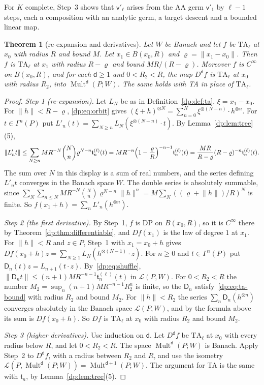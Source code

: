 \documentclass[11pt]{amsart}
\newtheorem{theorem}{Theorem}[section]
\theoremstyle{definition}
\theoremstyle{remark}
\numberwithin{equation}{section}
\newcommand{\cL}{\mathcal L}
\newcommand{\Mult}{\operatorname{Mult}}
\newcommand{\norm}[1]{\lVert #1\rVert}
\theoremstyle{plain}
\theoremstyle{definition}
\theoremstyle{plain}
\begin{document}
For $K$ complete, Step~3 shows that $\mathsf v'_\ell$ arises from the AA germ $\mathsf v'_1$ by $\ell-1$ steps, each a composition with an analytic germ, a target descent and a bounded linear map.

\begin{theorem}[re-expansion and derivatives]\label{dp:thm:ta-recenter}
Let $W$ be Banach and let $f$ be $\mathrm{TA}_\ell$ at $x_0$ with radius $R$ and bound $M$. Let $x_1\in B(x_0,R)$ and $\varrho=\norm{x_1-x_0}$. Then $f$ is $\mathrm{TA}_\ell$ at $x_1$ with radius $R-\varrho$ and bound $MR/(R-\varrho)$. Moreover $f$ is $C^\infty$ on $B(x_0,R)$, and for each $\mathsf d\ge1$ and $0<R_2<R$, the map $D^{\mathsf d}f$ is $\mathrm{TA}_\ell$ at $x_0$ with radius $R_2$, into $\Mult^{\mathsf d}(P;W)$. The same holds with TA in place of $\mathrm{TA}_\ell$.
\end{theorem}

\begin{proof}
\emph{Step 1 (re-expansion).} Let $L_N$ be as in Definition~\ref{dp:def:ta}, $\xi=x_1-x_0$. For $\norm h<R-\varrho$, \eqref{dp:eq:orbit} gives $(\xi+h)^{\otimes N}=\sum_{n=0}^N\xi^{\otimes(N-n)}\cdot h^{\otimes n}$. For $t\in\Gamma^n(P)$ put $L'_n(t)=\sum_{N\ge n}L_N(\xi^{\otimes(N-n)}\cdot t)$. By Lemma~\ref{dp:lem:tree}(5),
\[
 \norm{L'_nt}\le\sum_{N\ge n}MR^{-N}\binom Nn\varrho^{N-n}\mathfrak t^{(\ell)}_n(t)=MR^{-n}\Bigl(1-\frac\varrho R\Bigr)^{-n-1}\mathfrak t^{(\ell)}_n(t)=\frac{MR}{R-\varrho}(R-\varrho)^{-n}\mathfrak t^{(\ell)}_n(t).
\]
The sum over $N$ in this display is a sum of real numbers, and the series defining $L'_nt$ converges in the Banach space $W$. The double series is absolutely summable, since $\sum_N\sum_{n\le N}MR^{-N}\binom Nn\varrho^{N-n}\norm h^n=M\sum_N((\varrho+\norm h)/R)^N$ is finite. So $f(x_1+h)=\sum_nL'_n(h^{\otimes n})$.

\emph{Step 2 (the first derivative).} By Step~1, $f$ is DP on $B(x_0,R)$, so it is $C^\infty$ there by Theorem~\ref{dp:thm:differentiable}, and $Df(x_1)$ is the law of degree $1$ at $x_1$. For $\norm h<R$ and $z\in P$, Step~1 with $x_1=x_0+h$ gives $Df(x_0+h)z=\sum_{N\ge1}L_N(h^{\otimes(N-1)}\cdot z)$. For $n\ge0$ and $t\in\Gamma^n(P)$ put $\mathsf D_n(t)z=L_{n+1}(t\cdot z)$. By~\eqref{dp:eq:shuffle}, $\norm{\mathsf D_nt}\le(n+1)MR^{-n-1}\mathfrak t^{(\ell)}_n(t)$ in $\cL(P,W)$. For $0<R_2<R$ the number $M_2=\sup_n(n+1)MR^{-n-1}R_2^n$ is finite, so the $\mathsf D_n$ satisfy~\eqref{dp:eq:ta-bound} with radius $R_2$ and bound $M_2$. For $\norm h<R_2$ the series $\sum_n\mathsf D_n(h^{\otimes n})$ converges absolutely in the Banach space $\cL(P,W)$, and by the formula above its sum is $Df(x_0+h)$. So $Df$ is $\mathrm{TA}_\ell$ at $x_0$ with radius $R_2$ and bound $M_2$.

\emph{Step 3 (higher derivatives).} Use induction on $\mathsf d$. Let $D^{\mathsf d}f$ be $\mathrm{TA}_\ell$ at $x_0$ with every radius below $R$, and let $0<R_2<R$. The space $\Mult^{\mathsf d}(P;W)$ is Banach. Apply Step~2 to $D^{\mathsf d}f$, with a radius between $R_2$ and $R$, and use the isometry $\cL(P,\Mult^{\mathsf d}(P;W))=\Mult^{\mathsf d+1}(P;W)$. The argument for TA is the same with $\mathfrak t_n$, by Lemma~\ref{dp:lem:tree}(5).
\end{proof}
\end{document}
